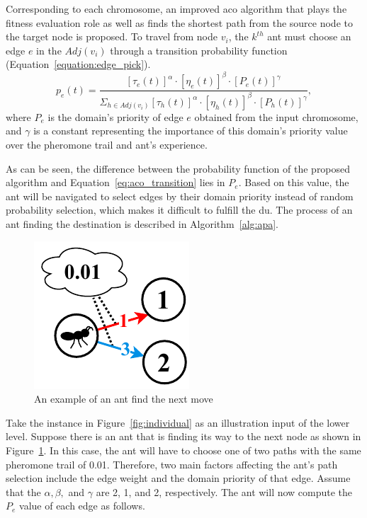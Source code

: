 Corresponding to each chromosome, an improved \gls{aco} algorithm that plays the fitness evaluation role as well as finds the shortest path from the source node to the target node is proposed. 
To travel from node $v_i$, the $k^{th}$ ant must choose an edge $e$ in the $Adj(v_i)$ through a transition probability function (Equation~\ref{equation:edge_pick}).
\begin{equation}
	\label{equation:edge_pick}
	p_e(t) = 
	\frac{[\tau_e(t)]^{\alpha} \cdot [\eta_e(t)]^{\beta} \cdot  [P_e(t)]^{\gamma}}{\Sigma_{h \in Adj(v_i)} [\tau_h(t)]^{\alpha} \cdot [\eta_h(t)]^{\beta} \cdot [P_h(t)]^{\gamma}},
\end{equation}
where $P_e$ is the domain's priority of edge $e$ obtained from the input chromosome, and $\gamma$ is a constant representing the importance of this domain's priority value over the pheromone trail and ant's experience.

As can be seen, the difference between the probability function of the proposed algorithm and Equation~\ref{eq:aco_transition} lies in $P_e$. Based on this value, the ant will be navigated to select edges by their domain priority instead of random probability selection, which makes it difficult to fulfill the \gls{du}. The process of an ant finding the destination is described in Algorithm~\ref{alg:apa}.
\bigskip
\setlength{\intextsep}{3pt}
\renewcommand{\scalefigure}{1.1}
\begin{figure}[htbp]
	\centering
	\includegraphics[scale=\scalefigure]{Figures/chap 3/pACO.pdf}
	\caption{An example of an ant find the next move}
	\label{fig:pACO}
\end{figure}

Take the instance in Figure~\ref{fig:individual} as an illustration input of the lower level. Suppose there is an ant that is finding its way to the next node as shown in Figure~\ref{fig:pACO}. In this case, the ant will have to choose one of two paths with the same pheromone trail of 0.01. Therefore, two main factors affecting the ant's path selection include the edge weight and the domain priority of that edge. Assume that the $\alpha, \beta,$ and $\gamma$ are 2, 1, and 2, respectively. The ant will now compute the $P_e$ value of each edge as follows.


